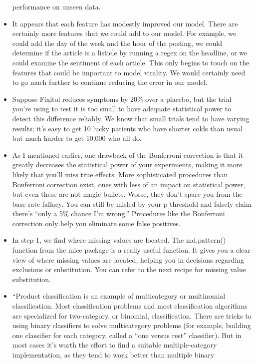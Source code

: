 \documentclass[]{book}
\theoremstyle{definition}
\theoremstyle{definition}
\theoremstyle{definition}
\theoremstyle{remark}
\begin{document}
\begin{itemize}
  performance on unseen data.
\item
  It appears that each feature has modestly improved our model. There
  are certainly more features that we could add to our model. For
  example, we could add the day of the week and the hour of the posting,
  we could determine if the article is a listicle by running a regex on
  the headline, or we could examine the sentiment of each article. This
  only begins to touch on the features that could be important to model
  virality. We would certainly need to go much further to continue
  reducing the error in our model.
\item
  Suppose Fixitol reduces symptoms by 20\% over a placebo, but the trial
  you're using to test it is too small to have adequate statistical
  power to detect this difference reliably. We know that small trials
  tend to have varying results; it's easy to get 10 lucky patients who
  have shorter colds than usual but much harder to get 10,000 who all
  do.
\item
  As I mentioned earlier, one drawback of the Bonferroni correction is
  that it greatly decreases the statistical power of your experiments,
  making it more likely that you'll miss true effects. More
  sophisticated procedures than Bonferroni correction exist, ones with
  less of an impact on statistical power, but even these are not magic
  bullets. Worse, they don't spare you from the base rate fallacy. You
  can still be misled by your p threshold and falsely claim there's
  ``only a 5\% chance I'm wrong.'' Procedures like the Bonferroni
  correction only help you eliminate some false positives.
\item
  In step 1, we find where missing values are located. The md.pattern()
  function from the mice package is a really useful function. It gives
  you a clear view of where missing values are located, helping you in
  decisions regarding exclusions or substitution. You can refer to the
  next recipe for missing value substitution.
\item
  ``Product classification is an example of multicategory or multinomial
  classification. Most classification problems and most classification
  algorithms are specialized for two-category, or binomial,
  classification. There are tricks to using binary classifiers to solve
  multicategory problems (for example, building one classifier for each
  category, called a ``one versus rest'' classifier). But in most cases
  it's worth the effort to find a suitable multiple-category
  implementation, as they tend to work better than multiple binary

\end{itemize}
\end{document}
